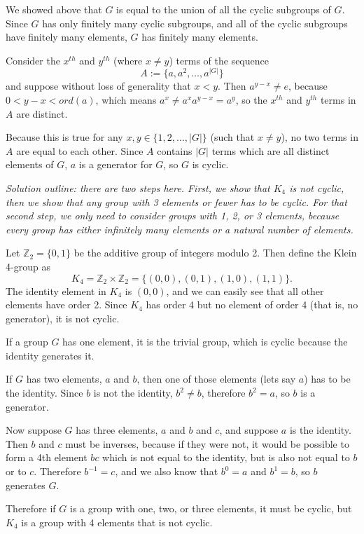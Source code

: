 \documentclass[12pt]{article}
\begin{document}
We showed above that $G$ is equal to the union of all the cyclic subgroups of $G$. Since $G$ has only finitely many cyclic subgroups, and all of the cyclic subgroups have finitely many elements, $G$ has finitely many elements.

\bigskip
\noindent{}\bigskip

Consider the $x^{th}$ and $y^{th}$ (where $x \neq y$) terms of the sequence
\[ A := \{a, a^2, \dots, a^{|G|}\} \]
and suppose without loss of generality that $x < y$. Then $a^{y-x} \neq e$, because $0 < y-x < ord(a)$, which means $a^x \neq a^x a^{y-x} = a^y$, so the $x^{th}$ and $y^{th}$ terms in $A$ are distinct.
\par
Because this is true for any $x, y \in \{1, 2, \dots, |G| \}$ (such that $x \neq y$), no two terms in $A$ are equal to each other. Since $A$ contains $|G|$ terms which are all distinct elements of $G$, $a$ is a generator for $G$, so $G$ is cyclic.

\bigskip
\noindent{}\bigskip

\textit{Solution outline: there are two steps here. First, we show that $K_4$ is not cyclic, then we show that any group with 3 elements or fewer has to be cyclic. For that second step, we only need to consider groups with 1, 2, or 3 elements, because every group has either infinitely many elements or a natural number of elements.}
\bigskip
\par
Let $\mathbb{Z}_2 = \{0,1\}$ be the additive group of integers modulo 2. Then define the Klein 4-group as
\[ K_4 = \mathbb{Z}_2 \times \mathbb{Z}_2 = \{(0,0), (0,1), (1,0), (1,1)\}. \]
The identity element in $K_4$ is $(0,0)$, and we can easily see that all other elements have order 2. Since $K_4$ has order 4 but no element of order 4 (that is, no generator), it is not cyclic.
\bigskip
\par
If a group $G$ has one element, it is the trivial group, which is cyclic because the identity generates it.
\par
If $G$ has two elements, $a$ and $b$, then one of those elements (lets say $a$) has to be the identity. Since $b$ is not the identity, $b^2 \neq b$, therefore $b^2 = a$, so $b$ is a generator.
\par
Now suppose $G$ has three elements, $a$ and $b$ and $c$, and suppose $a$ is the identity. Then $b$ and $c$ must be inverses, because if they were not, it would be possible to form a 4th element $bc$ which is not equal to the identity, but is also not equal to $b$ or to $c$. Therefore $b^{-1}=c$, and we also know that $b^0=a$ and $b^1=b$, so $b$ generates $G$.
\par
Therefore if $G$ is a group with one, two, or three elements, it must be cyclic, but $K_4$ is a group with 4 elements that is not cyclic.
\end{document}
